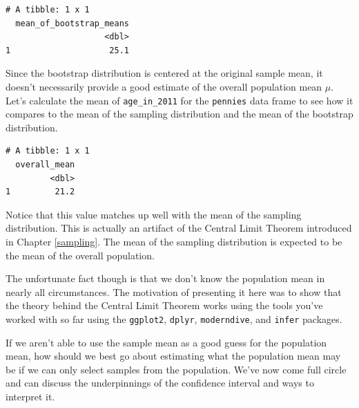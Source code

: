 \documentclass[12pt, krantz2,]{krantz}
\makeatletter
\newenvironment{Shaded}{\begin{snugshade}}{\end{snugshade}}
\newcommand{\DataTypeTok}[1]{\textcolor[rgb]{0.27,0.27,0.27}{#1}}
\newcommand{\DecValTok}[1]{\textcolor[rgb]{0.06,0.06,0.06}{#1}}
\newcommand{\KeywordTok}[1]{\textcolor[rgb]{0.27,0.27,0.27}{\textbf{#1}}}
\newcommand{\NormalTok}[1]{#1}
\newcommand{\OperatorTok}[1]{\textcolor[rgb]{0.43,0.43,0.43}{\textbf{#1}}}
\newcommand{\StringTok}[1]{\textcolor[rgb]{0.5,0.5,0.5}{#1}}
\newenvironment{kframe}{%
\medskip{}
\setlength{\fboxsep}{.8em}
 \def\at@end@of@kframe{}%
 \ifinner\ifhmode%
  \def\at@end@of@kframe{\end{minipage}}%
  \begin{minipage}{\columnwidth}%
 \fi\fi%
 \def\FrameCommand##1{\hskip\@totalleftmargin \hskip-\fboxsep
 \colorbox{shadecolor}{##1}\hskip-\fboxsep
     \hskip-\linewidth \hskip-\@totalleftmargin \hskip\columnwidth}%
 \MakeFramed {\advance\hsize-\width
   \@totalleftmargin\z@ \linewidth\hsize
   \@setminipage}}%
 {\par\unskip\endMakeFramed%
 \at@end@of@kframe}
\renewenvironment{Shaded}{\begin{kframe}}{\end{kframe}}
\makeatother
\begin{document}
\begin{Shaded}
\end{Shaded}

\begin{verbatim}
# A tibble: 1 x 1
  mean_of_bootstrap_means
                    <dbl>
1                    25.1
\end{verbatim}

Since the bootstrap distribution is centered at the original sample mean, it doesn't necessarily provide a good estimate of the overall population mean \(\mu\). Let's calculate the mean of \texttt{age\_in\_2011} for the \texttt{pennies} data frame to see how it compares to the mean of the sampling distribution and the mean of the bootstrap distribution.

\begin{Shaded}
\end{Shaded}

\begin{verbatim}
# A tibble: 1 x 1
  overall_mean
         <dbl>
1         21.2
\end{verbatim}

Notice that this value matches up well with the mean of the sampling distribution. This is actually an artifact of the Central Limit Theorem introduced in Chapter \ref{sampling}. The mean of the sampling distribution is expected to be the mean of the overall population.

The unfortunate fact though is that we don't know the population mean in nearly all circumstances. The motivation of presenting it here was to show that the theory behind the Central Limit Theorem works using the tools you've worked with so far using the \texttt{ggplot2}, \texttt{dplyr}, \texttt{moderndive}, and \texttt{infer} packages.

If we aren't able to use the sample mean as a good guess for the population mean, how should we best go about estimating what the population mean may be if we can only select samples from the population. We've now come full circle and can discuss the underpinnings of the confidence interval and ways to interpret it.
\end{document}
